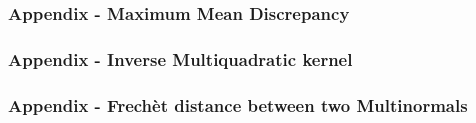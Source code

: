 \documentclass{beamer}
\begin{document}
\begin{frame}
\frametitle{Appendix - Maximum Mean Discrepancy}

\end{frame}
\begin{frame}
\frametitle{Appendix - Inverse Multiquadratic kernel}

\end{frame}
\begin{frame}
\frametitle{Appendix - Frechèt distance between two Multinormals}

\end{frame}
%
\end{document}

